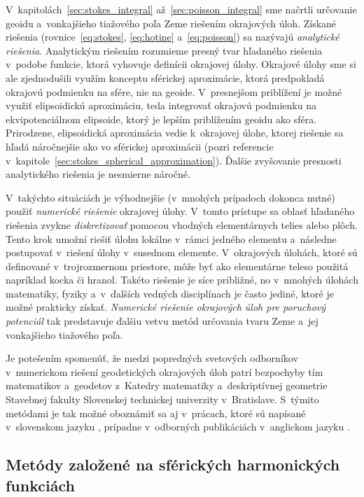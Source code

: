 \documentclass[a4paper, 12pt]{book}
\begin{document}
V~kapitolách~\ref{sec:stokes_integral} až~\ref{sec:poisson_integral} sme 
načrtli určovanie geoidu a~vonkajšieho tiažového poľa Zeme riešením okrajových 
úloh.  Získané riešenia (rovnice~\ref{eq:stokes}, \ref{eq:hotine} 
a~\ref{eq:poisson}) sa nazývajú \emph{analytické riešenia}.  Analytickým 
riešením rozumieme presný tvar hľadaného riešenia v~podobe funkcie, ktorá 
vyhovuje definícii okrajovej úlohy.  Okrajové úlohy sme si ale zjednodušili 
využím konceptu sférickej aproximácie, ktorá predpokladá okrajovú podmienku na 
sfére, nie na geoide.  V~presnejšom priblížení je možné využiť elipsoidickú 
aproximáciu, teda integrovať okrajovú podmienku na ekvipotenciálnom elipsoide, 
ktorý je lepším priblížením geoidu ako sféra.  Prirodzene, elipsoidická 
aproximácia vedie k~okrajovej úlohe, ktorej riešenie sa hľadá náročnejšie ako 
vo sférickej aproximácii (pozri referencie 
v~kapitole~\ref{sec:stokes_spherical_approximation}).  Ďalšie zvyšovanie 
presnosti analytického riešenia je nesmierne náročné.

V~takýchto situáciách je výhodnejšie (v~mnohých prípadoch dokonca nutné) použiť 
\emph{numerické riešenie} okrajovej úlohy.  V~tomto prístupe sa oblasť 
hľadaného riešenia zvykne \emph{diskretizovať} pomocou vhodných elementárnych 
telies alebo plôch.  Tento krok umožní riešiť úlohu lokálne v~rámci jedného 
elementu a~následne postupovať v~riešení úlohy v~susednom elemente.  
V~okrajových úlohách, ktoré sú definované v~trojrozmernom priestore, môže byť 
ako elementárne teleso použitá napríklad kocka či hranol.  Takéto riešenie je 
síce približné, no v~mnohých úlohách matematiky, fyziky a~v~ďalších vedných 
disciplínach je často jediné, ktoré je možné prakticky získať.  \emph{Numerické 
riešenie okrajových úloh pre poruchový potenciál} tak predstavuje ďalšiu vetvu 
metód určovania tvaru Zeme a~jej vonkajšieho tiažového poľa.

Je potešením spomenúť, že medzi popredných svetových odborníkov v~numerickom 
riešení geodetických okrajových úloh patrí bezpochyby tím matematikov 
a~geodetov z~Katedry matematiky a~deskriptívnej geometrie Stavebnej fakulty 
Slovenskej technickej univerzity v~Bratislave.  S~týmito metódami je tak možné 
oboznámiť sa aj v~prácach, ktoré sú napísané v~slovenskom jazyku 
\parencite[napríklad][]{Janak2006,Macak2021}, prípadne v~odborných publikáciách 
v~anglickom jazyku 
\parencite[napríklad][]{Cunderlik2008,Faskova2010,Macak2014}.


\subsection{Metódy založené na sférických harmonických funkciách}
\end{document}
